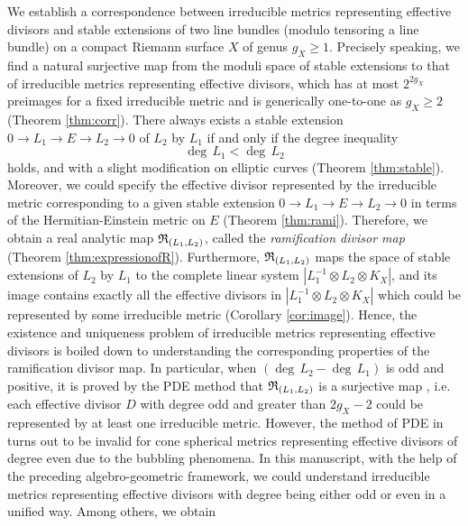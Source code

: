 \documentclass[12pt]{article}
\begin{document}
We establish a correspondence between irreducible metrics representing effective divisors and stable extensions of two line bundles (modulo tensoring a line bundle) on a compact Riemann surface $X$ of genus $g_X \geq 1$. Precisely speaking, we find a natural surjective map from the moduli space of stable extensions to that of irreducible metrics representing effective divisors, which  has at most $2^{2g_X}$ preimages for a fixed irreducible metric and is generically one-to-one as $g_X \geq 2$ (Theorem \ref{thm:corr}). There always exists a stable extension $0\to L_1\to E\to L_2\to 0$  of $L_2$ by $L_1$ if and only if the degree inequality
\[ \deg \, L_1 < \deg \, L_2 \]
holds, and with a slight modification on elliptic curves (Theorem \ref{thm:stable}). Moreover, we could specify the effective divisor represented by the irreducible metric corresponding to a given stable extension  $0\to L_1\to E\to L_2\to 0$ in terms of the Hermitian-Einstein metric on $E$ (Theorem \ref{thm:rami}). Therefore, we obtain a real analytic map ${\frak R}_{(L_1,L_2)}$, called the {\it ramification divisor map} (Theorem \ref{thm:expressionofR}). Furthermore, ${\frak R}_{(L_1,L_2)}$ maps the space of stable extensions of $L_2$ by $L_1$ to the complete linear system $\left|L_1^{-1}\otimes L_2 \otimes K_{X}\right|$, and its image contains exactly all the effective divisors in $\left|L_1^{-1}\otimes L_2 \otimes K_{X}\right|$ which could be represented by some irreducible metric (Corollary \ref{cor:image}). Hence, the existence and uniqueness problem of irreducible metrics representing effective divisors is boiled down to understanding the corresponding properties of the ramification divisor map. In particular, when $( \deg\,L_2-\deg\, L_1)$ is odd and positive, it is proved by the PDE method that ${\frak R}_{(L_1,L_2)}$ is a surjective map \cite{BdMM11, Troyanov91}, i.e. each effective divisor $D$ with degree odd and greater than $2g_X-2$ could be represented by at least one irreducible metric. However, the method of PDE in \cite{BdMM11, Troyanov91}  turns out to be invalid for  cone spherical metrics representing effective divisors of degree even due to the bubbling phenomena. In this manuscript, with the help of the preceding algebro-geometric framework, we could understand irreducible metrics representing effective divisors with degree being either odd or even in a unified way. Among others, we obtain \\
\end{document}

